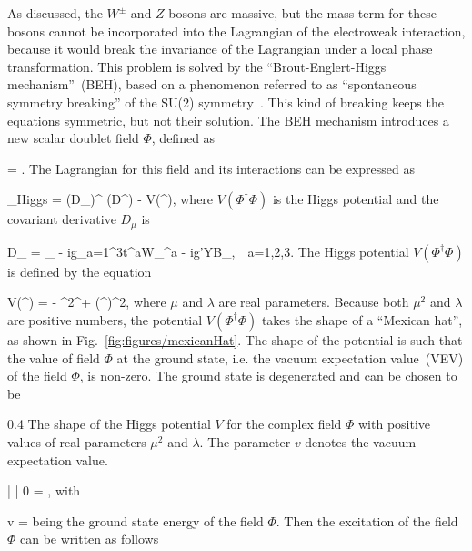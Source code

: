 As discussed, the $W^{\pm}$ and $Z$ bosons are massive, but the mass term for these bosons cannot be incorporated into the Lagrangian of the electroweak interaction, because it would break the invariance of the Lagrangian under a local phase transformation. This problem is solved by the ``Brout-Englert-Higgs mechanism''~(BEH), based on a phenomenon referred to as ``spontaneous symmetry breaking'' of the SU(2) symmetry~\cite{Englert:1964et, Guralnik:1964eu}. This kind of breaking keeps the equations symmetric, but not their solution. The BEH mechanism introduces a new scalar doublet field $\Phi$, defined as

{
    \Phi = .
}
The Lagrangian for this field and its interactions can be expressed as 

{
    _{Higgs} =  (D_{\mu}\Phi)^{\dagger} (D^{\mu}\Phi) - V(\Phi^{\dagger}\Phi),
}
where $V(\Phi^{\dagger}\Phi)$ is the Higgs potential and the covariant derivative $D_{\mu}$ is

{
   D_{\mu} = \partial_{\mu} - ig\sum_{a=1}^{3}t^{a}W_{\mu}^{a} - ig'YB_{\mu},~~a=1,2,3.
}
The Higgs potential $V(\Phi^{\dagger}\Phi)$ is defined by the equation

{
    V(\Phi^{\dagger}\Phi) =  -  \mu^{2}\Phi^{\dagger}\Phi +  \lambda(\Phi^{\dagger}\Phi)^{2},
}
where $\mu$ and $\lambda$ are real parameters. Because both $\mu^{2}$ and $\lambda$ are positive numbers, the potential $V(\Phi^{\dagger}\Phi)$ takes the shape of a ``Mexican hat'', as shown in Fig.~\ref{fig:figures/mexicanHat}. The shape of the potential is such that the value of field $\Phi$ at the ground state, i.e. the vacuum expectation value~(VEV) of the field $\Phi$, is non-zero. The ground state is degenerated and can be chosen to be

                 {0.4}       %
                 { The shape of the Higgs potential $V$ for the complex field $\Phi$ with positive values of real parameters $\mu^{2}$ and $\lambda$. The parameter $v$ denotes the vacuum expectation value.}

{
     | \Phi | 0 \rangle =  ,
}
with

{
v = 
}
being the ground state energy of the field $\Phi$. Then the excitation of the field $\Phi$ can be written as follows

